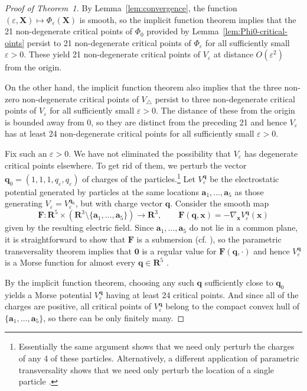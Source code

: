 \documentclass[12pt,a4paper]{article}
\theoremstyle{plain}
\theoremstyle{definition}
\newcommand{\R}{\mathbf{R}}
\begin{document}
	
	\begin{proof}[Proof of Theorem~1]
		By Lemma~\ref{lem:convergence}, the function $(\varepsilon,\mathbf{X}) \mapsto \Phi_\varepsilon(\mathbf{X})$
		is smooth, so the implicit function theorem implies that the 21 non-degenerate critical points of $\Phi_0$ provided by Lemma~\ref{lem:Phi0-critical-oints} persist to 21 non-degenerate critical points of $\Phi_\varepsilon$ for all sufficiently small $\varepsilon > 0$.
		These yield 21 non-degenerate critical points of $V_\varepsilon$  at distance $O(\varepsilon^2)$ from the origin.
		
		On the other hand, the implicit function theorem also implies that the three non-zero non-degenerate critical points of $V_\triangle$ persist to three non-degenerate critical points of $V_\varepsilon$ for all sufficiently small $\varepsilon >0$. The distance of these from the origin is bounded away from $0$, so they are distinct from the preceding 21 and hence $V_\varepsilon$ has at least 24 non-degenerate critical points for all sufficiently small $\varepsilon >0$.
		
		Fix such an $\varepsilon > 0$.
		We have not eliminated the possibility that $V_\varepsilon$ has degenerate critical points elsewhere.
		To get rid of them, we perturb the vector $\mathbf{q}_0 = (1,1,1,q_\varepsilon,q_\varepsilon)$ of charges of the particles.\footnote{Essentially the same argument shows that we need only perturb the charges of any 4 of these particles. Alternatively, a different application of parametric transversality shows that we need only perturb the location of a single particle \cite[Thm.~6.2]{morse1969critical}.}
		Let $V^{\mathbf{q}}_\varepsilon$ be the electrostatic potential generated by particles at the same locations $\mathbf{a}_1,\ldots, \mathbf{a}_5$ as those generating $V_\varepsilon = V^{\mathbf{q}_0}_\varepsilon$, but with charge vector $\mathbf{q}$.
		Consider the smooth map
		\begin{equation*}
			\mathbf{F}\colon \R^5 \times (\R^3 \setminus \{\mathbf{a}_1,\ldots ,\mathbf{a}_5\}) \to \R^3, \qquad   \mathbf{F}(\mathbf{q},\mathbf{x}) =  -\nabla_{\mathbf{x}} V^{\mathbf{q}}_\varepsilon(\mathbf{x})  
		\end{equation*}
		given by the resulting electric field.
		Since $\mathbf{a}_1,\ldots, \mathbf{a}_5$ do not lie in a common plane, it is straightforward to show that $\mathbf{F}$ is a submersion (cf. \cite[Ex.~1.7.22]{guillemin1974differential}), so the parametric transversality theorem implies that $\mathbf{0}$ is a regular value for $\mathbf{F}(\mathbf{q},\cdot)$ and hence $V^{\mathbf{q}}_\varepsilon$ is a Morse function for almost every $\mathbf{q}\in \R^5$ \cite[p.~68]{guillemin1974differential}. 
		
		By the implicit function theorem, choosing any such $\mathbf{q}$ sufficiently close to $\mathbf{q}_0$ yields a Morse potential $V^{\mathbf{q}}_\varepsilon$ having at least 24 critical points.
		And since all of the charges are positive, all critical points of $V^{\mathbf{q}}_\varepsilon$ belong to the compact convex hull of $\{\mathbf{a}_1,\ldots,\mathbf{a}_5\}$, so there can be only finitely many.
	\end{proof}
	
\end{document}
